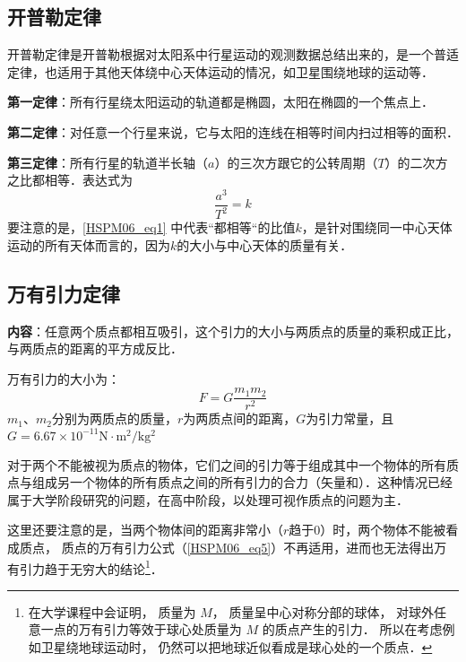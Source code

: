 
\begin{issues}
\issueDraft
\issueTODO
\end{issues}

\subsection{开普勒定律}

开普勒定律是开普勒根据对太阳系中行星运动的观测数据总结出来的，是一个普适定律，也适用于其他天体绕中心天体运动的情况，如卫星围绕地球的运动等．

\textbf{第一定律}：所有行星绕太阳运动的轨道都是椭圆，太阳在椭圆的一个焦点上．

\textbf{第二定律}：对任意一个行星来说，它与太阳的连线在相等时间内扫过相等的面积．

\textbf{第三定律}：所有行星的轨道半长轴（$a$）的三次方跟它的公转周期（$T$）的二次方之比都相等．表达式为
\begin{equation}\label{HSPM06_eq1}
\frac{a^3}{T^2}=k
\end{equation}
要注意的是，\autoref{HSPM06_eq1} 中代表“都相等“的比值$k$，是针对围绕同一中心天体运动的所有天体而言的，因为$k$的大小与中心天体的质量有关．

\subsection{万有引力定律}

\textbf{内容}：任意两个质点都相互吸引，这个引力的大小与两质点的质量的乘积成正比，与两质点的距离的平方成反比．

万有引力的大小为：
\begin{equation}\label{HSPM06_eq5}
F=G\frac{m_1m_2}{r^2}
\end{equation}
$m_1$、$m_2$分别为两质点的质量，$r$为两质点间的距离，$G$为引力常量，且$G=6.67\times 10^{-11}\mathrm{N\cdot m^2/kg^2}$

对于两个不能被视为质点的物体，它们之间的引力等于组成其中一个物体的所有质点与组成另一个物体的所有质点之间的所有引力的合力（矢量和）．这种情况已经属于大学阶段研究的问题，在高中阶段，以处理可视作质点的问题为主．

这里还要注意的是，当两个物体间的距离非常小（$r$趋于$0$）时，两个物体不能被看成质点， 质点的万有引力公式（\autoref{HSPM06_eq5}）不再适用，进而也无法得出万有引力趋于无穷大的结论\footnote{在大学课程中会证明， 质量为 $M$， 质量呈中心对称分部的球体， 对球外任意一点的万有引力等效于球心处质量为 $M$ 的质点产生的引力． 所以在考虑例如卫星绕地球运动时， 仍然可以把地球近似看成是球心处的一个质点．}．


